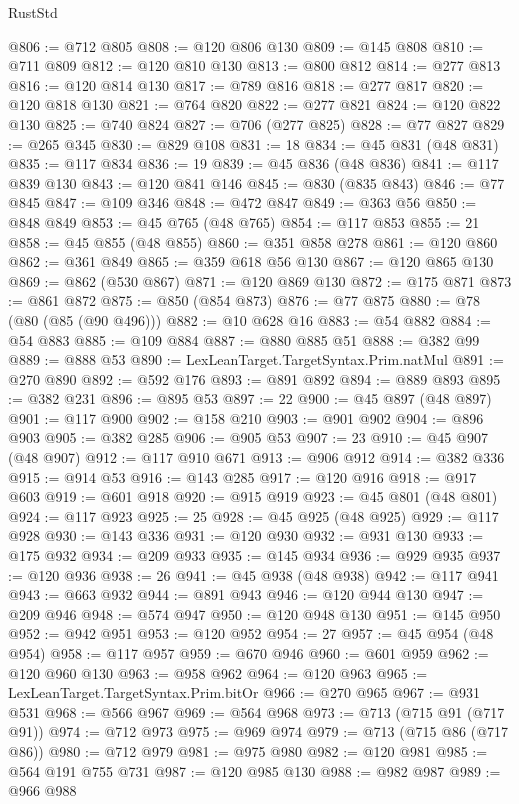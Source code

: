 \begin{lexlean}{RustStd}
\begin{coremodule}
@806 := @712 @805
@808 := @120 @806 @130
@809 := @145 @808
@810 := @711 @809
@812 := @120 @810 @130
@813 := @800 @812
@814 := @277 @813
@816 := @120 @814 @130
@817 := @789 @816
@818 := @277 @817
@820 := @120 @818 @130
@821 := @764 @820
@822 := @277 @821
@824 := @120 @822 @130
@825 := @740 @824
@827 := @706 (@277 @825)
@828 := @77 @827
@829 := @265 @345
@830 := @829 @108
@831 := 18
@834 := @45 @831 (@48 @831)
@835 := @117 @834
@836 := 19
@839 := @45 @836 (@48 @836)
@841 := @117 @839 @130
@843 := @120 @841 @146
@845 := @830 (@835 @843)
@846 := @77 @845
@847 := @109 @346
@848 := @472 @847
@849 := @363 @56
@850 := @848 @849
@853 := @45 @765 (@48 @765)
@854 := @117 @853
@855 := 21
@858 := @45 @855 (@48 @855)
@860 := @351 @858 @278
@861 := @120 @860
@862 := @361 @849
@865 := @359 @618 @56 @130
@867 := @120 @865 @130
@869 := @862 (@530 @867)
@871 := @120 @869 @130
@872 := @175 @871
@873 := @861 @872
@875 := @850 (@854 @873)
@876 := @77 @875
@880 := @78 (@80 (@85 (@90 @496)))
@882 := @10 @628 @16
@883 := @54 @882
@884 := @54 @883
@885 := @109 @884
@887 := @880 @885 @51
@888 := @382 @99
@889 := @888 @53
@890 := LexLeanTarget.TargetSyntax.Prim.natMul
@891 := @270 @890
@892 := @592 @176
@893 := @891 @892
@894 := @889 @893
@895 := @382 @231
@896 := @895 @53
@897 := 22
@900 := @45 @897 (@48 @897)
@901 := @117 @900
@902 := @158 @210
@903 := @901 @902
@904 := @896 @903
@905 := @382 @285
@906 := @905 @53
@907 := 23
@910 := @45 @907 (@48 @907)
@912 := @117 @910 @671
@913 := @906 @912
@914 := @382 @336
@915 := @914 @53
@916 := @143 @285
@917 := @120 @916
@918 := @917 @603
@919 := @601 @918
@920 := @915 @919
@923 := @45 @801 (@48 @801)
@924 := @117 @923
@925 := 25
@928 := @45 @925 (@48 @925)
@929 := @117 @928
@930 := @143 @336
@931 := @120 @930
@932 := @931 @130
@933 := @175 @932
@934 := @209 @933
@935 := @145 @934
@936 := @929 @935
@937 := @120 @936
@938 := 26
@941 := @45 @938 (@48 @938)
@942 := @117 @941
@943 := @663 @932
@944 := @891 @943
@946 := @120 @944 @130
@947 := @209 @946
@948 := @574 @947
@950 := @120 @948 @130
@951 := @145 @950
@952 := @942 @951
@953 := @120 @952
@954 := 27
@957 := @45 @954 (@48 @954)
@958 := @117 @957
@959 := @670 @946
@960 := @601 @959
@962 := @120 @960 @130
@963 := @958 @962
@964 := @120 @963
@965 := LexLeanTarget.TargetSyntax.Prim.bitOr
@966 := @270 @965
@967 := @931 @531
@968 := @566 @967
@969 := @564 @968
@973 := @713 (@715 @91 (@717 @91))
@974 := @712 @973
@975 := @969 @974
@979 := @713 (@715 @86 (@717 @86))
@980 := @712 @979
@981 := @975 @980
@982 := @120 @981
@985 := @564 @191 @755 @731
@987 := @120 @985 @130
@988 := @982 @987
@989 := @966 @988

\end{coremodule}
\end{lexlean}
